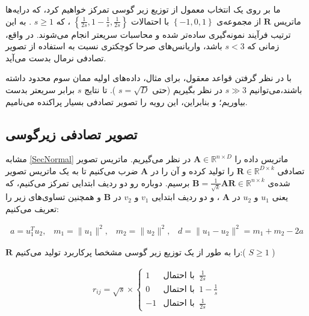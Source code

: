ما بر روی یک انتخاب معمول از توزیع زیر گوسی تمرکز خواهیم کرد، که درایه‌ها ماتریس 
$\mathbf{R}$
از مجموعه‌ی 
$\left\{ -1, 0, 1 \right\}$
با احتمالات 
$\left\{ \frac{1}{2s}, 1 - \frac{1}{s}, \frac{1}{2s} \right\}$
، که 
$s \geq 1$
. به این ترتیب فرآیند نمونه‌گیری ساده‌تر شده و محاسبات سریعتر انجام می‌شوند. در واقع، زمانی که 
$s < 3$
باشد، واریانس‌های صرحا کوچکتری نسبت به استفاده از تصویر تصادفی نرمال بدست می‌آید.

با در نظر گرفتن قواعد معقول، برای مثال، داده‌های اولیه ممان سوم محدود داشته باشند،می‌توانیم 
$s \gg 3$
در نظر بگیریم (حتی 
$s = \sqrt{D}$
).
تا نتایج 
$s$
برابر سریعتر بدست بیاوریم؛ و بنابراین، این رویه را تصویر تصادفی بسیار پراکنده می‌نامیم.


\subsection{
تصویر تصادفی زیرگوسی
}

مشابه
\autoref{SecNormal}
ماتریس داده را 
$\mathbf{A} \in \mathbb{R}^{n \times D}$
در نظر می‌گیریم. ماتریس تصویر تصادفی 
$\mathbf{R} \in \mathbb{R}^{D \times k}$
را تولید کرده و آن را در 
$\mathbf{A}$
ضرب می‌کنیم تا به یک ماتریس تصویر شده‌‌ی 
$\mathbf{B} = \frac{1}{\sqrt{k}} \mathbf{AR} \in \mathbb{R}^{n \times k}$
برسیم. دوباره رو دو ردیف ابتدایی تمرکز می‌کنیم، که یعنی 
$u_1$
و 
$u_2$
در 
$\mathbf{A}$
، و دو ردیف ابتدایی 
$v_1$
و 
$v_2$
در 
$\mathbf{B}$
و همچنین تساوی‌های زیر را تعریف می‌کنیم:

\begin{align}
a = u_1^T u_2, \;\;\; m_1 = \| u_1 \|^2, \;\;\; m_2 = \| u_2 \|^2, \;\;\;
d = \| u_1 - u_2 \|^2 = m_1 + m_2 - 2a
\label{eq:1iL}
\end{align}

$\mathbf{R}$
را به طور 
از یک توزیع زیر گوسی مشخصا پرکاربرد تولید می‌کنیم:(
$S \geq 1$
)

\begin{align}
r_{ij} = \sqrt{s} \times 
\begin{cases}
1 & \text{با احتمال} \;\; \frac{1}{2s}\\
0 & \text{با احتمال} \;\; 
1-\frac{1}{s}\\
-1 & \text{با احتمال} \;\; \frac{1}{2s}
\end{cases} 
\label{eq:1iM}
\end{align}

